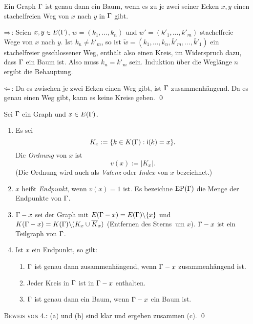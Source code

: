 \PROP Ein Graph $\Gamma$ ist genau dann ein Baum, wenn es zu je zwei
seiner Ecken $x,y$ einen stachelfreien Weg von $x$ nach $y$ in
$\Gamma$ gibt.

\bew \glqq$\Rightarrow$\grqq: Seien $x,y\in E(\Gamma)$,
$w=(k_1,\ldots,k_n)$ und $w'=(k'_1,\ldots,k'_m)$ stachelfreie Wege
von $x$ nach $y$. Ist $k_n\neq k'_m$, so ist
$\tilde{w}=(k_1,\ldots,k_n,\bar{k}'_m,\ldots,\bar{k}'_1)$
ein stachelfreier geschlossener Weg, enthält also einen
Kreis, im Widerspruch dazu, dass $\Gamma$ ein Baum ist.
Also muss $k_n=k'_m$ sein. Induktion über die Weglänge $n$ ergibt
die Behauptung.

\glqq $\Leftarrow$\grqq: Da es zwischen je zwei Ecken einen Weg gibt, ist
$\Gamma$ zusammenhängend. Da es genau einen Weg gibt, kann es keine
Kreise geben.
\qed

\DB Sei $\Gamma$ ein Graph und $x\in E(\Gamma)$.
\begin{enumerate}
\item Es sei
\[
K_x := \{ k\in K(\Gamma) : \mathsf{i}(k)=x \}.
\]
Die \emph{Ordnung} von $x$ ist
\[
v(x) := |K_x|.
\]
(Die Ordnung wird auch als \emph{Valenz}
oder \emph{Index}  von
$x$ bezeichnet.)
\item $x$ heißt \emph{Endpunkt}, wenn $v(x)=1$ ist.
Es bezeichne $\mathrm{EP}(\Gamma)$ die Menge der Endpunkte von $\Gamma$.
\item $\Gamma-x$ sei der Graph mit $E(\Gamma-x)=E(\Gamma)\backslash\{x\}$
und $K(\Gamma-x)=K(\Gamma)\backslash(K_x\cup \overline{K}_x)$
(Entfernen des \glqq Sterns\grqq\ um $x$). $\Gamma-x$ ist ein Teilgraph
von $\Gamma$.
\item Ist $x$ ein Endpunkt, so gilt:
\begin{enumerate}
	\item $\Gamma$ ist genau dann zusammenhängend, wenn $\Gamma-x$
	zusammenhängend ist.
	\item Jeder Kreis in $\Gamma$ ist in $\Gamma-x$ enthalten.
	\item $\Gamma$ ist genau dann ein Baum, wenn $\Gamma-x$ ein Baum ist.
\end{enumerate}
\end{enumerate}
\textsc{Beweis von 4.:} (a) und (b) sind klar und ergeben
zusammen (c).
\qed

